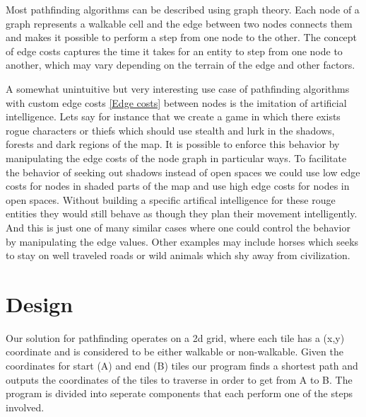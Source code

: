 \documentclass[12pt, a4paper]{article}
\begin{document}
Most pathfinding algorithms can be described using graph theory. Each node of a
graph represents a walkable cell and the edge between two nodes connects them
and makes it possible to perform a step from one node to the other. The concept
of edge costs captures the time it takes for an entity to step from one node to
another, which may vary depending on the terrain of the edge and other factors.




A somewhat unintuitive but very interesting use case of pathfinding algorithms
with custom edge costs \ref{Edge costs} between nodes is the imitation of
artificial intelligence. Lets say for instance that we create a game in which
there exists rogue characters or thiefs which should use stealth and lurk in the
shadows, forests and dark regions of the map. It is possible to enforce this
behavior by manipulating the edge costs of the node graph in particular ways. To
facilitate the behavior of seeking out shadows instead of open spaces we could
use low edge costs for nodes in shaded parts of the map and use high edge costs
for nodes in open spaces. Without building a specific artifical intelligence for
these rouge entities they would still behave as though they plan their movement
intelligently. And this is just one of many similar cases where one could
control the behavior by manipulating the edge values. Other examples may include
horses which seeks to stay on well traveled roads or wild animals which shy away
from civilization.



\section{Design}
Our solution for pathfinding operates on a 2d grid, where each tile has a (x,y) coordinate and is considered to be either walkable or non-walkable. Given the coordinates for start (A) and end (B) tiles our program finds a shortest path and outputs the coordinates of the tiles to traverse in order to get from A to B. The program is divided into seperate components that each perform one of the steps involved.
\end{document}
